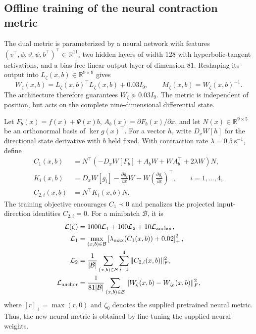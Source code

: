 \documentclass[11pt]{article}
\begin{document}
\subsection{Offline training of the neural contraction metric}

The dual metric is parameterized by a neural network with features
$(v^\top,\phi,\vartheta,\psi,b^\top)^\top\in\mathbb R^{11}$,
two hidden layers of width $128$ with hyperbolic-tangent activations,
and a bias-free linear output layer of dimension $81$.
Reshaping its output into $L_\zeta(x,b)\in\mathbb R^{9\times9}$ gives
\begin{equation}\label{eq:quad-neural-metric}
    W_\zeta(x,b)=L_\zeta(x,b)^\top L_\zeta(x,b)+0.03I_9,
    \qquad M_\zeta(x,b)=W_\zeta(x,b)^{-1}.
\end{equation}
The architecture therefore guarantees $W_\zeta\succeq0.03I_9$.
The metric is independent of position, but acts on the complete
nine-dimensional differential state.

Let $F_b(x)=f(x)+\Psi(x)b$,
$A_b(x)=\partial F_b(x)/\partial x$, and let
$N(x)\in\mathbb R^{9\times5}$ be an orthonormal basis of
$\ker g(x)^\top$. For a vector $h$, write $D_xW[h]$ for the
directional state derivative with $b$ held fixed.
With contraction rate $\lambda=0.5~\mathrm{s^{-1}}$, define
\begin{align}
    C_1(x,b)&=N^\top\left(-D_xW[F_b]+A_bW+WA_b^\top
        +2\lambda W\right)N,\label{eq:quad-c1}\\
    K_i(x,b)&=D_xW[g_i]-\frac{\partial g_i}{\partial x}W
        -W\left(\frac{\partial g_i}{\partial x}\right)^\top,
        \qquad i=1,\ldots,4,\\
    C_{2,i}(x,b)&=N^\top K_i(x,b)N.\label{eq:quad-c2}
\end{align}
The training objective encourages $C_1\prec0$ and penalizes the
projected input-direction identities $C_{2,i}=0$.
For a minibatch $\mathcal B$, it is
\begin{align}
    \mathcal L(\zeta)&=1000\mathcal L_1+100\mathcal L_2
        +10\mathcal L_{\rm anchor},\\
    \mathcal L_1&=\max_{(x,b)\in\mathcal B}
        \left[\lambda_{\max}(C_1(x,b))+0.02\right]_+^2,\\
    \mathcal L_2&=\frac{1}{|\mathcal B|}
        \sum_{(x,b)\in\mathcal B}\sum_{i=1}^{4}
        \|C_{2,i}(x,b)\|_F^2,\\
    \mathcal L_{\rm anchor}&=\frac{1}{81|\mathcal B|}
        \sum_{(x,b)\in\mathcal B}
        \|W_\zeta(x,b)-W_{\zeta_0}(x,b)\|_F^2,
\end{align}
where $[r]_+=\max(r,0)$ and $\zeta_0$ denotes the supplied pretrained
neural metric. Thus, the new neural metric is obtained by fine-tuning
the supplied neural weights.
\end{document}
